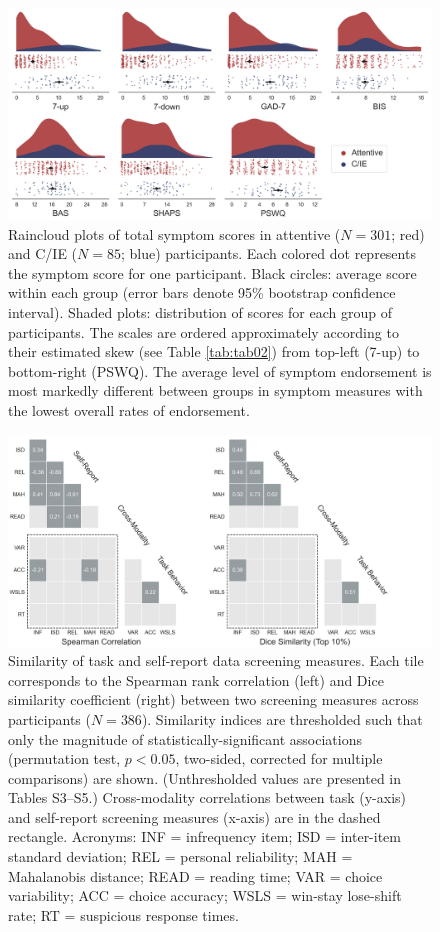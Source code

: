 \documentclass[a4paper,notitlepage,12pt]{article}
\begin{document}
\clearpage
\begin{figure}[h]
    \includegraphics[width=16cm]{../figures/main_02a.png}
    \centering
    \caption{Raincloud plots of total symptom scores in attentive ($N=301$; red) and C/IE ($N=85$; blue) participants. Each colored dot represents the symptom score for one participant. Black circles: average score within each group (error bars denote 95\% bootstrap confidence interval). Shaded plots: distribution of scores for each group of participants. The scales are ordered approximately according to their estimated skew (see Table \ref{tab:tab02}) from top-left (7-up) to bottom-right (PSWQ). The average level of symptom endorsement is most markedly different between groups in symptom measures with the lowest overall rates of endorsement.}
    \label{fig:fig01}
\end{figure}

\clearpage
\begin{figure}[h]
    \includegraphics[width=16cm, trim=0 0 3cm 0]{../figures/main_02b.png}
    \centering
    \caption{Similarity of task and self-report data screening measures. Each tile corresponds to the Spearman rank correlation (left) and Dice similarity coefficient (right) between two screening measures across participants ($N=386$). Similarity indices are thresholded such that only the magnitude of statistically-significant associations (permutation test, $p<0.05$, two-sided, corrected for multiple comparisons) are shown. (Unthresholded values are presented in Tables S3--S5.) Cross-modality correlations between task (y-axis) and self-report screening measures (x-axis) are in the dashed rectangle. Acronyms: INF = infrequency item; ISD = inter-item standard deviation; REL = personal reliability; MAH = Mahalanobis distance; READ = reading time; VAR = choice variability; ACC = choice accuracy; WSLS = win-stay lose-shift rate; RT = suspicious response times.}
    \label{fig:fig02}
\end{figure}
\end{document}
